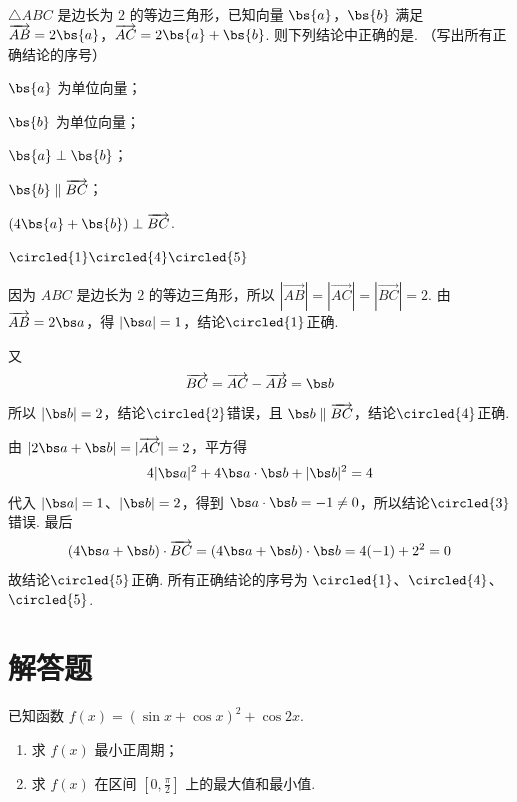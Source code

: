 \begin{problem}
\(\triangle ABC\) 是边长为 \(2\) 的等边三角形，已知向量 \(\bs{a}\)，\(\bs{b}\) 满足 \(\overrightarrow{AB} = 2\bs{a}\)，\(\overrightarrow{AC} = 2\bs{a} + \bs{b}\). 则下列结论中正确的是\fillinblank{}. （写出所有正确结论的序号）

\begin{circlelist}
\item \(\bs{a}\) 为单位向量；
\item \(\bs{b}\) 为单位向量；
\item \(\bs{a}\perp\bs{b}\)；
\item \(\bs{b}\parallel\overrightarrow{BC}\)；
\item \(\left(4\bs{a}+\bs{b}\right)\perp\overrightarrow{BC}\).
\end{circlelist}

\begin{answer}
\(\circled{1}\circled{4}\circled{5}\)
\end{answer}

\begin{solution}
因为 \(ABC\) 是边长为 \(2\) 的等边三角形，所以 \(|\overrightarrow{AB}|=|\overrightarrow{AC}|=|\overrightarrow{BC}|=2\). 由 \(\overrightarrow{AB}=2\bs a\)，得 \(|\bs a|=1\)，结论\(\circled{1}\)正确.

又
\[
\overrightarrow{BC}=\overrightarrow{AC}-\overrightarrow{AB}=\bs b
\]
所以 \(|\bs b|=2\)，结论\(\circled{2}\)错误，且 \(\bs b\parallel\overrightarrow{BC}\)，结论\(\circled{4}\)正确.

由 \(|2\bs a+\bs b|=|\overrightarrow{AC}|=2\)，平方得
\[
4|\bs a|^2+4\bs a\cdot\bs b+|\bs b|^2=4
\]
代入 \(|\bs a|=1\)、\(|\bs b|=2\)，得到 \(\bs a\cdot\bs b=-1\ne0\)，所以结论\(\circled{3}\)错误. 最后
\[
\left(4\bs a+\bs b\right)\cdot\overrightarrow{BC}
=\left(4\bs a+\bs b\right)\cdot\bs b
=4(-1)+2^2=0
\]
故结论\(\circled{5}\)正确. 所有正确结论的序号为 \(\circled{1}\)、\(\circled{4}\)、\(\circled{5}\).
\end{solution}
\end{problem}

\section{解答题}

\begin{problem}
已知函数 \( f(x) = (\sin x + \cos x)^2 + \cos 2x \).
\begin{enumerate}
\item 求 \( f(x) \) 最小正周期；
\item 求 \( f(x) \) 在区间 \( \left[0, \frac{\pi}{2}\right] \) 上的最大值和最小值.
\end{enumerate}
\end{problem}


